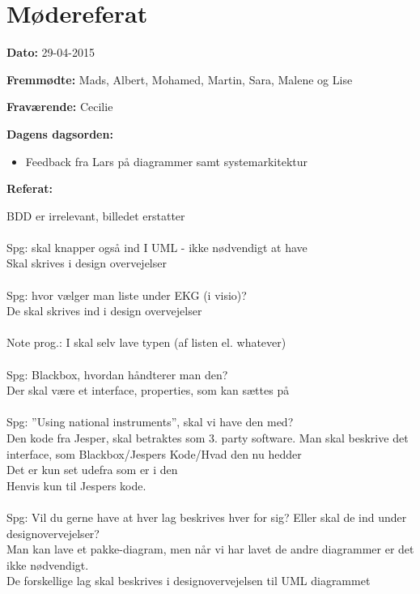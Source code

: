 \chapter{Mødereferat}

\textbf{Dato:} 29-04-2015

\textbf{Fremmødte:} Mads, Albert, Mohamed, Martin, Sara, Malene og Lise

\textbf{Fraværende:} Cecilie

\textbf{Dagens dagsorden:}
\begin{itemize}
	\item Feedback fra Lars på diagrammer samt systemarkitektur
\end{itemize}

\textbf{Referat:}

BDD er irrelevant, billedet erstatter
\\ \\
Spg: skal knapper også ind I UML - ikke nødvendigt at have \\
	Skal skrives i design overvejelser
\\
\\

Spg: hvor vælger man liste under EKG (i visio)?\\
	De skal skrives ind i design overvejelser
\\
\\

Note prog.: I skal selv lave typen (af listen el. whatever)
\\
\\

Spg: Blackbox, hvordan håndterer man den?\\
	Der skal være et interface, properties, som kan sættes på
\\
\\
	
Spg: ”Using national instruments”, skal vi have den med?\\
	Den kode fra Jesper, skal betraktes som 3. party software.
	Man skal beskrive det interface, som Blackbox/Jespers Kode/Hvad den nu hedder\\
	Det er kun set udefra som er i den\\
	Henvis kun til Jespers kode.
\\
\\

Spg: Vil du gerne have at hver lag beskrives hver for sig? Eller skal de ind under designovervejelser?\\
Man kan lave et pakke-diagram, men når vi har lavet de andre diagrammer er det ikke nødvendigt.\\
De forskellige lag skal beskrives i designovervejelsen til UML diagrammet
\\
\\

